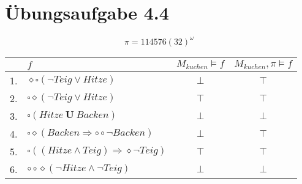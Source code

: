 \documentclass[a4paper]{scrartcl}
\begin{document}
\section*{Übungsaufgabe 4.4}
\begin{equation*}
    \pi = 114576(32)^\omega
\end{equation*}

\begin{tabular}{r|l|c|c}
       & $f$ & $M_{kuchen} \models  f$ & $M_{kuchen}, \pi \models  f$ \\ \hline
    1. & $\diamond\square(\lnot Teig \lor Hitze)$                     & $\bot$ & $\top$ \\
    2. & $\square\diamond(\lnot Teig \lor Hitze)$                     & $\top$ & $\top$ \\
    3. & $\square(Hitze ~\textbf{U}~ Backen)$                         & $\bot$ & $\bot$ \\
    4. & $\square\diamond(Backen \Rightarrow \circ\circ\lnot Backen)$ & $\bot$ & $\top$ \\
    5. & $\square((Hitze \land Teig) \Rightarrow \diamond\lnot Teig)$ & $\top$ & $\top$ \\
    6. & $\circ\circ\diamond(\lnot Hitze \land \lnot Teig)$           & $\bot$ & $\bot$ \\
\end{tabular}
\end{document}
